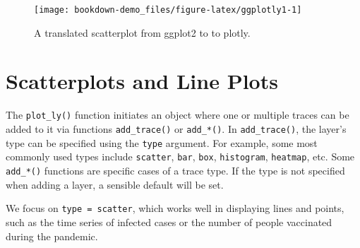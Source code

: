 \documentclass[]{book}
\newenvironment{Shaded}{\begin{snugshade}}{\end{snugshade}}
\newcommand{\KeywordTok}[1]{\textcolor[rgb]{0.13,0.29,0.53}{\textbf{#1}}}
\newcommand{\DataTypeTok}[1]{\textcolor[rgb]{0.13,0.29,0.53}{#1}}
\newcommand{\StringTok}[1]{\textcolor[rgb]{0.31,0.60,0.02}{#1}}
\newcommand{\CommentTok}[1]{\textcolor[rgb]{0.56,0.35,0.01}{\textit{#1}}}
\newcommand{\OperatorTok}[1]{\textcolor[rgb]{0.81,0.36,0.00}{\textbf{#1}}}
\newcommand{\NormalTok}[1]{#1}
\begin{document}
\begin{Shaded}
\end{Shaded}

\begin{figure}

{\centering \texttt{[image: bookdown-demo\_files/figure-latex/ggplotly1-1]} 

}

\caption{A translated scatterplot from ggplot2 to to plotly.}\label{fig:ggplotly1}
\end{figure}

\section{Scatterplots and Line Plots}\label{scatterplots-and-line-plots}

The \texttt{plot\_ly()} function initiates an object where one or
multiple traces can be added to it via functions \texttt{add\_trace()}
or \texttt{add\_*()}. In \texttt{add\_trace()}, the layer's type can be
specified using the \texttt{type} argument. For example, some most
commonly used types include
\texttt{\textquotesingle{}scatter\textquotesingle{}},
\texttt{\textquotesingle{}bar\textquotesingle{}},
\texttt{\textquotesingle{}box\textquotesingle{}},
\texttt{\textquotesingle{}histogram\textquotesingle{}},
\texttt{\textquotesingle{}heatmap\textquotesingle{}}, etc. Some
\texttt{add\_*()} functions are specific cases of a trace type. If the
type is not specified when adding a layer, a sensible default will be
set.

We focus on
\texttt{type\ =\ \textquotesingle{}scatter\textquotesingle{}}, which
works well in displaying lines and points, such as the time series of
infected cases or the number of people vaccinated during the pandemic.
\end{document}
